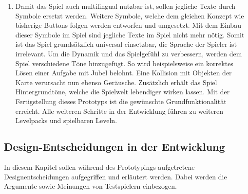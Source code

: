 \begin{enumerate}[itemindent=*,labelsep=\textwidth,label=\textbf{Prototyp \arabic*}]
		\item{ Damit das Spiel auch multilingual nutzbar ist, sollen jegliche Texte durch Symbole ersetzt werden. Weitere Symbole, welche dem gleichen Konzept wie bisherige Buttons folgen werden entworfen und umgesetzt. Mit dem Einbau dieser Symbole im Spiel sind jegliche Texte im Spiel nicht mehr nötig. Somit ist das Spiel grundsätzlich universal einsetzbar, die Sprache der Spieler ist irrelevant. Um die Dynamik und das Spielgefühl zu verbessern, werden dem Spiel verschiedene Töne hinzugefügt. So wird beispielsweise ein korrektes Lösen einer Aufgabe mit Jubel belohnt. Eine Kollision mit Objekten der Karte verursacht nun ebenso Geräusche. Zusätzlich erhält das Spiel Hintergrundtöne, welche die Spielwelt lebendiger wirken lassen. Mit der Fertigstellung dieses Prototyps ist die gewünschte Grundfunktionalität erreicht. Alle weiteren Schritte in der Entwicklung führen zu weiteren Levelpacks und spielbaren Leveln.}
	\end{enumerate}
\subsection{Design-Entscheidungen in der Entwicklung}
In diesem Kapitel sollen während des Prototypings aufgetretene Designentscheidungen aufgegriffen und erläutert werden. Dabei werden die Argumente sowie Meinungen von Testspielern einbezogen.
